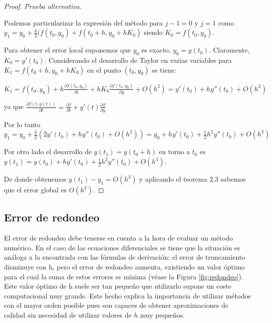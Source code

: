 \documentclass{article}
\theoremstyle{theorem-style}  %
\theoremstyle{definition-style}
\theoremstyle{example-style}
\begin{document}
		\begin{proof} \textit{Prueba alternativa.}
			
			Podemos particularizar la expresión del método para $j-1 = 0$ y $j=1$ como 
			$y_1=y_0+\frac{h}{2}(f(t_0,y_0)+f(t_0+h,y_0+h K_0)$ siendo $K_0=f(t_0,y_0)$. 
			
			Para obtener el error local suponemos que $y_0$ es exacto, $y_0=y(t_0)$. Claramente, $K_0 = y'(t_0)$. Considerando el desarrollo de Taylor en varias variables para $K_1=f(t_0+h,y_0+h K_0)$ en el punto $(t_0,y_0)$ se tiene:

			
			$K_1 = f(t_0,y_0) + h \frac{\partial f(t_0,y_0)}{\partial t}+h K_0\frac{\partial f(t_0,y_0)}{\partial y}+O(h^{2})=y'(t_0)+hy''(t_0)+O(h^{2})$ 
			
			ya que $\frac{\partial f(t,y(t))}{\partial t} = \frac{\partial f}{\partial t} + y'(t)\frac{\partial f}{\partial y}$
			
			Por lo tanto $y_1=y_0+\frac{h}{2}(2y'(t_0)+hy''(t_0)+O(h^2))=y_0+hy'(t_0)+\frac{1}{2}h^{2}y''(t_0)+O(h^3)$
			
			Por otro lado el desarrollo de $y(t_1)=y(t_0 + h)$ en torno a $t_0$ es 
			$y(t_1)=y(t_0)+hy'(t_0)+\frac{1}{2}h^{2}y''(t_0)+O(h^{3})$. 
			
			De donde obtenemos $y(t_1)-y_1=O(h^{3})$ y aplicando el teorema 2.3 sabemos que el error global es $O(h^{2})$.
		\end{proof}
		
	\subsection{Error de redondeo} \label{sec:trapecio-explicito:redondeo}

		El error de redondeo debe tenerse en cuenta a la hora de evaluar un método numérico. En el caso de las ecuaciones diferenciales se tiene que la situación es análoga a la encontrada con las fórmulas de derivación: el error de truncamiento disminuye con h, pero el error de redondeo aumenta, existiendo un valor óptimo para el cual la suma de estos errores es mínima (véase la Figura \ref{fig:redondeo}). Este valor óptimo de h suele ser tan pequeño que utilizarlo supone un coste computacional muy grande. Este hecho explica la importancia de utilizar métodos con el mayor orden posible pues son capaces de obtener aproximaciones de calidad sin necesidad de utilizar valores de $h$ muy pequeños. \cite{Vazquez}
		
\end{document}
